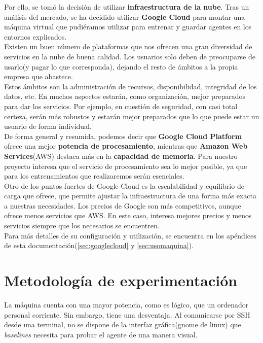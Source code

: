 \documentclass[11pt,fleqn]{book} %
\begin{document}
Por ello, se tomó la decisión de utilizar \textbf{infraestructura de la nube}. Tras un análisis del mercado, se ha decidido utilizar \textbf{Google Cloud} para montar una máquina virtual que pudiéramos utilizar para entrenar y guardar agentes en los entornos explicados.\\

Existen un buen número de plataformas que nos ofrecen una gran diversidad de servicios en la nube de buena calidad. Los usuarios solo deben de preocuparse de usarlo(y pagar lo que corresponda), dejando el resto de ámbitos a la propia empresa que abastece. \\

Estos ámbitos son la administración de recursos, disponibilidad, integridad de los datos, etc. En muchos aspectos estarán, como organización, mejor preparados para dar los servicios. Por ejemplo, en cuestión de seguridad, con casi total certeza, serán más robustos y estarán mejor preparados que lo que puede estar un usuario de forma individual. \\

De forma general y resumida, podemos decir que \textbf{Google Cloud Platform} ofrece una mejor \textbf{potencia de procesamiento}, mientras que \textbf{Amazon Web Services}(AWS) destaca más en la \textbf{capacidad de memoria}. Para nuestro proyecto interesa que el servicio de procesamiento sea lo mejor posible, ya que para los entrenamientos que realizaremos serán esenciales. \\

Otro de los puntos fuertes de Google Cloud es la escalabilidad y equilibrio de carga que ofrece, que permite ajustar la infraestructura de una forma más exacta a nuestras necesidades. Los precios de Google son más competitivos, aunque ofrece menos servicios que AWS. En este caso, interesa mejores precios y menos servicios siempre que los necesarios se encuentren. \\

Para más detalles de su configuración y utilización, se encuentra en los apéndices de esta documentación(\ref{sec:googlecloud} y \ref{sec:usomaquina}).

\section{Metodología de experimentación}

La máquina cuenta con una mayor potencia, como es lógico, que un ordenador personal corriente. Sin embargo, tiene una desventaja. Al comunicarse por SSH desde una terminal, no se dispone de la interfaz gráfica(gnome de linux) que \textit{baselines} necesita para probar el agente de una manera visual. \\
\end{document}

